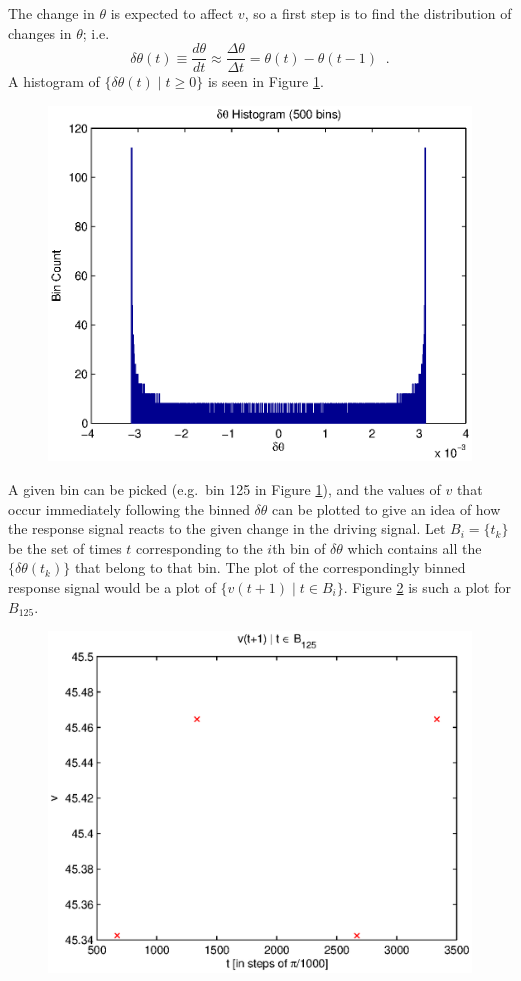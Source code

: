 \documentclass[a4paper,11pt]{article}
\begin{document}
The change in $\theta$ is expected to affect $v$, so a first step is to find the distribution of changes in $\theta$; i.e.\
$$
\delta\theta(t) \equiv \frac{d\theta}{dt} \approx \frac{\Delta\theta}{\Delta t} = \theta(t)-\theta(t-1)\;\;.
$$
A histogram of $\{\delta\theta(t)\;|\;t\ge 0\}$ is seen in Figure \ref{fig:dthetahist}.
\begin{figure}[ht]
\includegraphics[scale=0.65]{dthetahist.eps}
\caption{}
\label{fig:dthetahist}
\end{figure}
A given bin can be picked (e.g.\ bin 125 in Figure \ref{fig:dthetahist}), and the values of $v$ that occur immediately following the binned $\delta\theta$ can be plotted to give an idea of how the response signal reacts to the given change in the driving signal.  Let $B_i = \{t_k\}$ be the set of times $t$ corresponding to the $i$th bin of $\delta\theta$ which contains all the $\{\delta\theta(t_k)\}$ that belong to that bin.  The plot of the correspondingly binned response signal would be a plot of $\{v(t+1)\;|\; t\in B_i\}$.  Figure \ref{fig:vbin125} is such a plot for $B_125$.
\begin{figure}[ht]
\includegraphics[scale=0.65]{vbin125.eps}
\caption{}
\label{fig:vbin125}
\end{figure}
\end{document}
